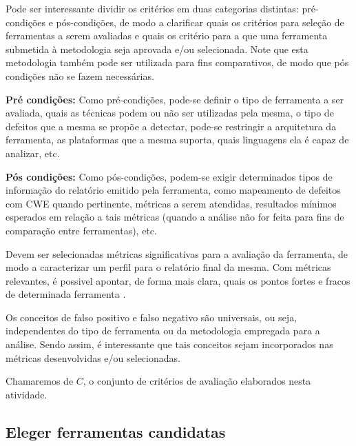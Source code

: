 Pode ser interessante dividir os critérios em duas categorias distintas: pré-condições e pós-condições, de modo a clarificar quais os critérios para seleção de ferramentas a serem avaliadas e quais os critério para a que uma ferramenta submetida à metodologia seja aprovada e/ou selecionada. Note que esta metodologia também pode ser utilizada para fins comparativos, de modo que pós condições não se fazem necessárias.

\textbf{Pré condições:} Como pré-condições, pode-se definir o tipo de ferramenta a ser avaliada, quais as técnicas podem ou não ser utilizadas pela mesma, o tipo de defeitos que a mesma se propõe a detectar, pode-se restringir a arquitetura da ferramenta, as plataformas que a mesma suporta, quais linguagens ela é capaz de analizar, etc.

\textbf{Pós condições:} Como pós-condições, podem-se exigir determinados tipos de informação do relatório emitido pela ferramenta, como mapeamento de defeitos com CWE quando pertinente, métricas a serem atendidas, resultados mínimos esperados em relação a tais métricas (quando a análise não for feita para fins de comparação entre ferramentas), etc.

Devem ser selecionadas métricas significativas para a avaliação da ferramenta, de modo a caracterizar um perfil para o relatório final da mesma. Com métricas relevantes, é possivel apontar, de forma mais clara, quais os pontos fortes e fracos de determinada ferramenta \cite{nsa}.

Os conceitos de falso positivo e falso negativo são universais, ou seja, independentes do tipo de ferramenta ou da metodologia empregada para a análise. Sendo assim, é interessante que tais conceitos sejam incorporados nas métricas desenvolvidas e/ou selecionadas.

Chamaremos de $C$, o conjunto de critérios de avaliação elaborados nesta atividade.

\subsection{Eleger ferramentas candidatas}

